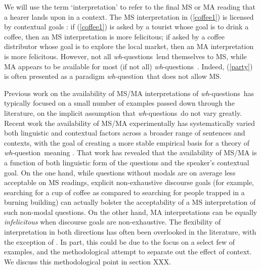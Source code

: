\documentclass[12pt,letterpaper,table,svgnames,dvipsnames]{article}
\newcommand{\jd}[1]{\textcolor{Purple}{[jd: #1]}}
\newcommand{\mm}[1]{\textcolor{teal}{[mm: #1]}}
\newcommand{\whq}{\emph{wh}-question~}
\newcommand{\whqs}{\emph{wh}-questions~}
\begin{document}
We will use the term `interpretation' to refer to the final MS or MA reading that a hearer lands upon in a context. The MS interpretation in (\ref{coffee1}) is licensed by contextual goals \cite{groenstok1982,groenstok1984}: if (\ref{coffee1}) is asked by a tourist whose goal is to drink a coffee, then an MS interpretation is more felicitous; if asked by a coffee distributor whose goal is to explore the local market, then an MA interpretation is more felicitous.
However, not all \whqs lend themselves to MS, while MA appears to be available for most (if not all) \whqs. Indeed, (\ref{party}) is often presented as a paradigm \whq that does not allow MS.

Previous work on the availability of MS/MA interpretations of \whqs has typically focused on a small number of examples passed down through the literature, on the implicit assumption that \whqs do not vary greatly. \cite{}
Recent work the availability of MS/MA experimentally has systematically varied both linguistic and contextual factors across a broader range of sentences and contexts, with the goal of creating a more stable empirical basis for a theory of \whq meaning \cite{moyersyrett2019,moyer2020}. That work has revealed that the availability of MS/MA is a function of both linguistic form of the questions and the speaker's contextual goal. 
On the one hand, while questions without modals are on average less acceptable on MS readings, explicit non-exhaustive discourse goals (for example, searching for a cup of coffee as compared to searching for people trapped in a burning building) can actually bolster the acceptability of a MS interpretation of such non-modal questions. On the other hand, MA interpretations can be equally \emph{infelicitous} when discourse goals are non-exhaustive. The flexibility of interpretation in both directions has often been overlooked in the literature, with the exception of . In part, this could be due to the focus on a select few of examples, and the methodological attempt to separate out the effect of context. We discuss this methodological point in section XXX. 
\end{document}
